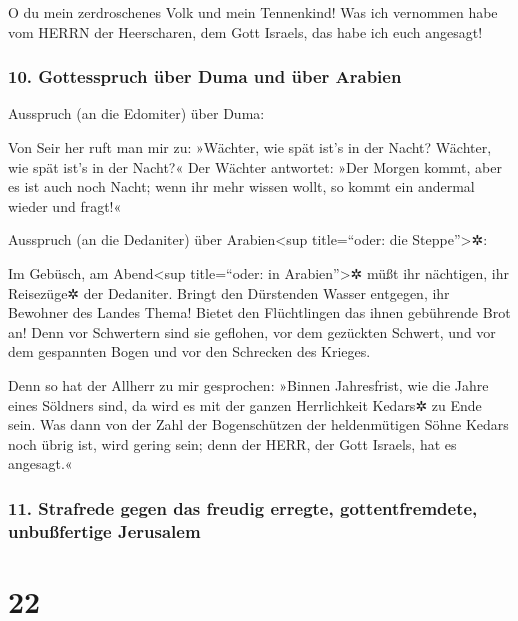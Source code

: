 O du mein zerdroschenes Volk und mein Tennenkind! Was ich
vernommen habe vom HERRN der Heerscharen, dem Gott Israels, das habe ich
euch angesagt!

\hypertarget{gottesspruch-uxfcber-duma-und-uxfcber-arabien}{%
\subsubsection{10. Gottesspruch über Duma und über
Arabien}\label{gottesspruch-uxfcber-duma-und-uxfcber-arabien}}

Ausspruch (an die Edomiter) über Duma:

Von Seir her ruft man mir zu: »Wächter, wie spät ist's in der Nacht?
Wächter, wie spät ist's in der Nacht?« Der Wächter
antwortet: »Der Morgen kommt, aber es ist auch noch Nacht; wenn ihr mehr
wissen wollt, so kommt ein andermal wieder und fragt!«

Ausspruch (an die Dedaniter) über Arabien\textless sup
title=``oder: die Steppe''\textgreater✲:

Im Gebüsch, am Abend\textless sup title=``oder: in
Arabien''\textgreater✲ müßt ihr nächtigen, ihr Reisezüge✲ der Dedaniter.
Bringt den Dürstenden Wasser entgegen, ihr Bewohner des
Landes Thema! Bietet den Flüchtlingen das ihnen gebührende Brot an!
Denn vor Schwertern sind sie geflohen, vor dem gezückten
Schwert, und vor dem gespannten Bogen und vor den Schrecken des Krieges.

Denn so hat der Allherr zu mir gesprochen: »Binnen
Jahresfrist, wie die Jahre eines Söldners sind, da wird es mit der
ganzen Herrlichkeit Kedars✲ zu Ende sein. Was dann von
der Zahl der Bogenschützen der heldenmütigen Söhne Kedars noch übrig
ist, wird gering sein; denn der HERR, der Gott Israels, hat es
angesagt.«

\hypertarget{strafrede-gegen-das-freudig-erregte-gottentfremdete-unbuuxdffertige-jerusalem}{%
\subsubsection{11. Strafrede gegen das freudig erregte, gottentfremdete,
unbußfertige
Jerusalem}\label{strafrede-gegen-das-freudig-erregte-gottentfremdete-unbuuxdffertige-jerusalem}}

\hypertarget{section-21}{%
\section{22}\label{section-21}}

